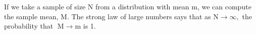 If we take a sample of size N from a distribution with mean 
m, we can compute the sample mean, M. The strong law of large
numbers says that as 
$ \mathrm{N} \to \infty , $ the probability that $ \; \mathrm{M} \to \mathrm{m} $
is 1.